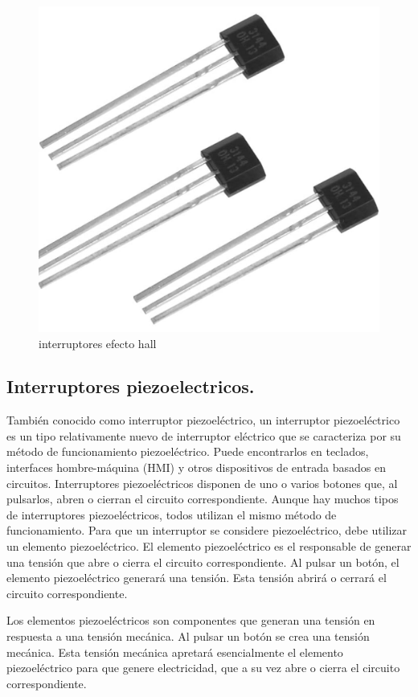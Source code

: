 \begin{figure}[h]
	\centering
	\includegraphics[width=0.7\linewidth]{img/int ef hall.png}
	\caption{interruptores efecto hall}
	\label{fig:insertarimagen}
\end{figure}

\subsection{Interruptores piezoelectricos.}

También conocido como interruptor piezoeléctrico, un interruptor piezoeléctrico es un tipo relativamente nuevo de interruptor eléctrico que se caracteriza por su método de funcionamiento piezoeléctrico. Puede encontrarlos en teclados, interfaces hombre-máquina (HMI) y otros dispositivos de entrada basados en circuitos. Interruptores piezoeléctricos disponen de uno o varios botones que, al pulsarlos, abren o cierran el circuito correspondiente.
Aunque hay muchos tipos de interruptores piezoeléctricos, todos utilizan el mismo método de funcionamiento. Para que un interruptor se considere piezoeléctrico, debe utilizar un elemento piezoeléctrico. El elemento piezoeléctrico es el responsable de generar una tensión que abre o cierra el circuito correspondiente. Al pulsar un botón, el elemento piezoeléctrico generará una tensión. Esta tensión abrirá o cerrará el circuito correspondiente.

Los elementos piezoeléctricos son componentes que generan una tensión en respuesta a una tensión mecánica. Al pulsar un botón se crea una tensión mecánica. Esta tensión mecánica apretará esencialmente el elemento piezoeléctrico para que genere electricidad, que a su vez abre o cierra el circuito correspondiente.

